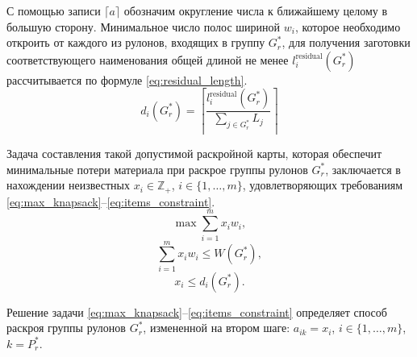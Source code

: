\documentclass[12pt]{article}
\begin{document}
С помощью записи $\lceil a \rceil$ обозначим округление числа к ближайшему 
целому в большую сторону. Минимальное число полос шириной $w_i$, которое 
необходимо откроить от каждого из рулонов, входящих в группу $G_r^*$, для 
получения заготовки соответствующего наименования общей длиной не менее 
$l_{i}^{\text{residual}}(G_r^*)$ рассчитывается по формуле 
\eqref{eq:residual_length}.
\begin{equation}\label{eq:residual_length}
d_i(G_r^*)=\left\lceil \frac{l_{i}^{\text{residual}}(G_r^*)}
                            {\sum_{j \in G_r^*} L_j} \right\rceil    
\end{equation}
    
Задача составления такой допустимой раскройной карты, которая обеспечит 
минимальные потери материала при раскрое группы рулонов $G_r^*$, заключается 
в нахождении неизвестных $x_i \in \mathbb Z_+$, $i \in \{1,\ldots,m\}$, 
удовлетворяющих требованиям 
\eqref{eq:max_knapsack}--\eqref{eq:items_constraint}.    
\begin{equation}\label{eq:max_knapsack}
    \max{\sum_{i=1}^{m} x_i w_i},
\end{equation}        
\begin{equation}\label{eq:knapsack_constraint}
    \sum_{i=1}^{m} x_i w_i \leq W(G_r^*),
\end{equation}        
\begin{equation}\label{eq:items_constraint}
    x_i \leq d_i(G_r^*).
\end{equation}        

Решение задачи 
\eqref{eq:max_knapsack}--\eqref{eq:items_constraint} 
определяет способ раскроя группы рулонов $G_r^*$, 
измененной на втором шаге: $a_{ik}=x_i$, $i \in \{1,\ldots,m\}$, $k=P_r^*$.
\end{document}
